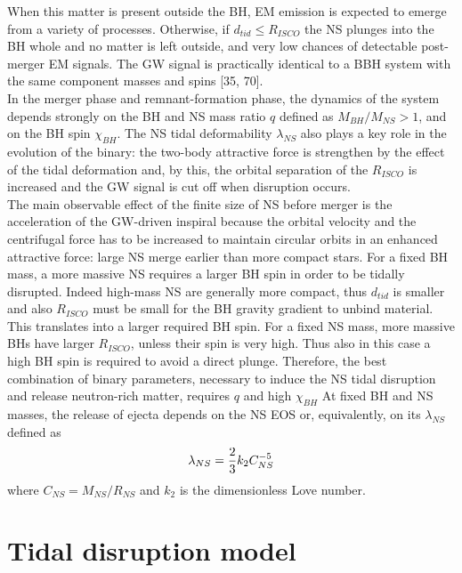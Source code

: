 \documentclass[binding=0.6cm, LaM]{sapthesis}
\begin{document}
        When this matter is present outside the BH, EM emission is expected to emerge from a variety of processes.
        Otherwise, if $d_{tid} \leq R_{ISCO}$ the NS plunges into the BH whole and no matter is left outside,
        and very low chances of detectable post-merger EM signals.
        The GW signal is practically identical to a BBH system with the same component masses and spins [35, 70]. \\
        In the merger phase and remnant-formation phase, the dynamics of the system depends
	strongly on the BH and NS mass ratio $q$ defined as $M_{BH}/M_{NS} > 1$, and on the BH spin $\chi_{BH}$.
        The NS tidal deformability $\lambda_{NS}$ also plays a key role in the evolution of the binary:
        the two-body attractive force is strengthen by the effect of the tidal deformation and, by this,
        the orbital separation of the $R_{ISCO}$ is increased and the GW  signal  is  cut  off  when
        disruption occurs. \\
        The main observable effect of the finite size of NS before merger is the acceleration of the GW-driven inspiral
        because the orbital velocity and the centrifugal force has to be increased to maintain circular orbits
        in an enhanced attractive force: large NS merge earlier than more compact stars.
        For a fixed BH mass, a more massive NS requires a larger BH spin in order to be tidally disrupted.
        Indeed high-mass NS are generally more compact, thus $d_{tid}$ is smaller and also
        $R_{ISCO}$ must be small for the BH gravity gradient to unbind material.
        This translates into a larger required BH spin. For a fixed NS mass, more massive BHs have larger
        $R_{ISCO}$, unless their spin is very high. Thus also in this case a high BH spin is required
        to  avoid  a  direct  plunge.  Therefore,  the  best  combination  of binary parameters,
        necessary to induce the NS tidal disruption and release neutron-rich matter, requires $q$ and high $\chi_{BH}$
        At fixed BH and NS masses, the release of ejecta depends on the NS EOS or, equivalently,
        on its $\lambda_{NS}$ defined as
                \begin{equation}
                        \lambda_{NS} = {{2} \over {3}} k_2 C_{NS}^{-5}
                \end{equation}
        where $C_{NS} = M_{NS}/R_{NS}$ and $k_2$ is the dimensionless Love number.

\section{Tidal disruption model}
\end{document}
